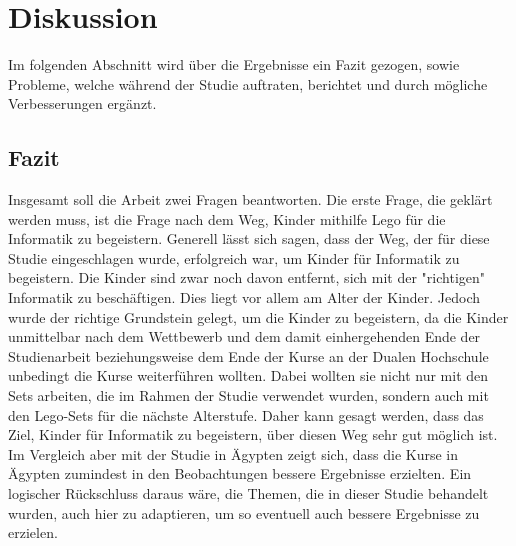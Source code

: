 \chapter{Diskussion}
Im folgenden Abschnitt wird über die Ergebnisse ein Fazit gezogen, sowie Probleme, welche während der Studie auftraten, berichtet und durch mögliche Verbesserungen ergänzt.
\section{Fazit}

Insgesamt soll die Arbeit zwei Fragen beantworten. Die erste Frage, die geklärt werden muss, ist die Frage nach dem Weg, Kinder mithilfe \gls{Lego} für die Informatik zu begeistern. Generell lässt sich sagen, dass der Weg, der für diese Studie eingeschlagen wurde, erfolgreich war, um Kinder für Informatik zu begeistern. Die Kinder sind zwar noch davon entfernt, sich mit der "richtigen" Informatik zu beschäftigen. Dies liegt vor allem am Alter der Kinder. Jedoch wurde der richtige Grundstein gelegt, um die Kinder zu begeistern, da die Kinder unmittelbar nach dem Wettbewerb und dem damit einhergehenden Ende der Studienarbeit beziehungsweise dem Ende der Kurse an der Dualen Hochschule unbedingt die Kurse weiterführen wollten. Dabei wollten sie nicht nur mit den Sets arbeiten, die im Rahmen der Studie verwendet wurden, sondern auch mit den Lego-Sets für die nächste Alterstufe. Daher kann gesagt werden, dass das Ziel, Kinder für Informatik zu begeistern, über diesen Weg sehr gut möglich ist.\\
Im Vergleich aber mit der Studie in Ägypten zeigt sich, dass die Kurse in Ägypten zumindest in den Beobachtungen bessere Ergebnisse erzielten. Ein logischer Rückschluss daraus wäre, die Themen, die in dieser Studie behandelt wurden, auch hier zu adaptieren, um so eventuell auch bessere Ergebnisse zu erzielen.\\


